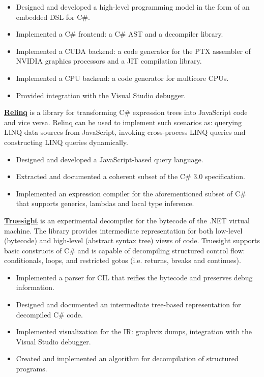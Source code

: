 \documentclass[margin, 10pt]{Stylesheet}
\begin{document}
\begin{resume}
\begin{itemize} \itemsep -2pt
\item Designed and developed a high-level programming model in the form of an embedded DSL for C\#.
\item Implemented a C\# frontend: a C\# AST and a decompiler library.
\item Implemented a CUDA backend: a code generator for the PTX assembler of NVIDIA graphics processors
and a JIT compilation library.
\item Implemented a CPU backend: a code generator for multicore CPUs.
\item Provided integration with the Visual Studio debugger.
\end{itemize}

\textbf{\href{http://code.google.com/p/relinq/}{Relinq}} is a library for transforming C\#
expression trees into JavaScript code and vice versa. Relinq can be used to implement such scenarios
as: querying LINQ data sources from JavaScript, invoking cross-process LINQ queries and constructing
LINQ queries dynamically.

\begin{itemize} \itemsep -2pt
\item Designed and developed a JavaScript-based query language.
\item Extracted and documented a coherent subset of the C\# 3.0 specification.
\item Implemented an expression compiler for the aforementioned subset of C\# that supports generics,
lambdas and local type inference.
\end{itemize}

\textbf{\href{http://code.google.com/p/truesight-lite/}{Truesight}} is an experimental decompiler
for the bytecode of the .NET virtual machine. The library provides intermediate representation for
both low-level (bytecode) and high-level (abstract syntax tree) views of code. Truesight supports
basic constructs of C\# and is capable of decompiling structured control flow: conditionals, loops,
and restricted gotos (i.e. returns, breaks and continues).

\begin{itemize} \itemsep -2pt
\item Implemented a parser for CIL that reifies the bytecode and preserves debug information.
\item Designed and documented an intermediate tree-based representation for decompiled C\# code.
\item Implemented visualization for the IR: graphviz dumps, integration with the Visual Studio debugger.
\item Created and implemented an algorithm for decompilation of structured programs.
\end{itemize}


\end{resume}
\end{document}
